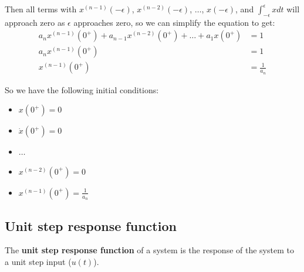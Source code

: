 Then all terms with $x^{(n-1)}(-\epsilon)$, $x^{(n-2)}(-\epsilon)$, $\ldots$, $x(-\epsilon)$, and $\int_{-\epsilon}^{\epsilon} x dt$ will approach zero as $\epsilon$ approaches zero, so we can simplify the equation to get:
\begin{align*}
a_n x^{(n-1)}(0^+) + a_{n-1} x^{(n-2)}(0^+) + \ldots + a_1 x(0^+) &= 1 \\
a_n x^{(n-1)}(0^+) &= 1 \\
x^{(n-1)}(0^+) &= \frac{1}{a_n}
\end{align*}

So we have the following initial conditions:
\begin{itemize}
    \item $x(0^+) = 0$
    \item $\dot{x}(0^+) = 0$
    \item $\ldots$
    \item $x^{(n-2)}(0^+) = 0$
    \item $x^{(n-1)}(0^+) = \frac{1}{a_n}$
\end{itemize}

\subsection{Unit step response function}

{
    The \textbf{unit step response function} of a system is the response of the system to a unit step input ($u(t)$).
}

